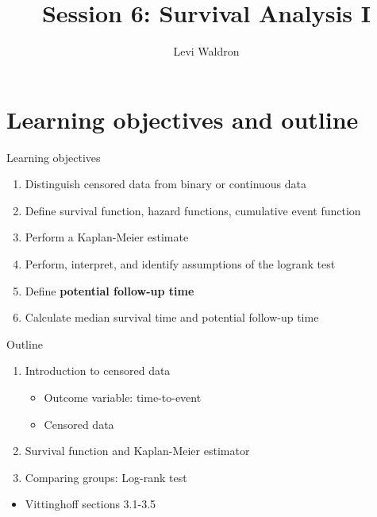\documentclass[
  ignorenonframetext,
]{beamer}
\title{Session 6: Survival Analysis I}
\author{Levi Waldron}
\date{}
\institute{CUNY SPH Biostatistics 2}
\providecommand{\tightlist}{%
  \setlength{\itemsep}{0pt}\setlength{\parskip}{0pt}}
\begin{document}
\frame{\titlepage}

\hypertarget{learning-objectives-and-outline}{%
\section{Learning objectives and
outline}\label{learning-objectives-and-outline}}

\begin{frame}{Learning objectives}
\protect\hypertarget{learning-objectives}{}

\begin{enumerate}
\tightlist
\item
  Distinguish censored data from binary or continuous data
\item
  Define survival function, hazard functions, cumulative event function
\item
  Perform a Kaplan-Meier estimate
\item
  Perform, interpret, and identify assumptions of the logrank test
\item
  Define \textbf{potential follow-up time}
\item
  Calculate median survival time and potential follow-up time
\end{enumerate}

\end{frame}

\begin{frame}{Outline}
\protect\hypertarget{outline}{}

\begin{enumerate}
\tightlist
\item
  Introduction to censored data

  \begin{itemize}
  \tightlist
  \item
    Outcome variable: time-to-event
  \item
    Censored data
  \end{itemize}
\item
  Survival function and Kaplan-Meier estimator
\item
  Comparing groups: Log-rank test
\end{enumerate}

\begin{itemize}
\tightlist
\item
  Vittinghoff sections 3.1-3.5
\end{itemize}

\end{frame}
\end{document}
